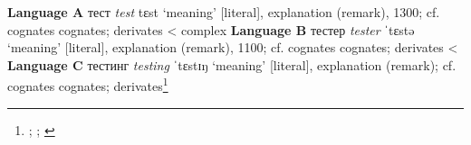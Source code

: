 \begin{etymology}\label{ety:tester}
\textbf{Language A} {тест} \textit{test} tɛst  `meaning' [literal], explanation (remark), 1300; cf. cognates cognates; derivates
< complex \textbf{Language B} {тестер} \textit{tester} ˈtɛstə  `meaning' [literal], explanation (remark), 1100; cf. cognates cognates; derivates
< \textbf{Language C} {тестинг} \textit{testing} ˈtɛstɪŋ  `meaning' [literal], explanation (remark); cf. cognates cognates; derivates\footnote{\textcite[test1]{oed}; \textcite[test2]{oed}; \textcite[test2]{oed}}
\end{etymology}